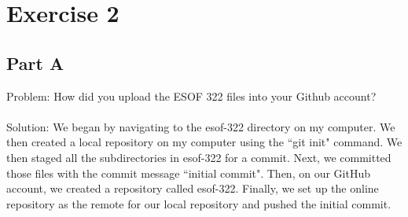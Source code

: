 \documentclass{article}
\begin{document}
\newpage

\section*{Exercise 2}

\subsection*{Part A}
Problem: How did you upload the ESOF 322 files into your Github account? \\\\
Solution: We began by navigating to the esof-322 directory on my computer. We then created a local repository on my computer using the ``git init" command.
We then staged all the subdirectories in esof-322 for a commit. Next, we committed those files with the commit message ``initial commit".
Then, on our GitHub account, we created a repository called esof-322.
Finally, we set up the online repository as the remote for our local repository and pushed the initial commit.
\end{document}
